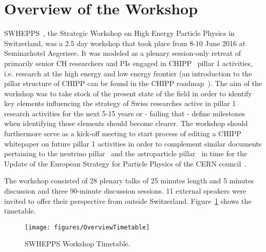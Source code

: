 \section{Overview of the Workshop}\label{Overview}

\noindent SWHEPPS~\cite{workshopindico},  the Strategic Workshop on High Energy Particle Physics in Switzerland, was a 2.5 day workshop that took place from 8-10 June 2016 at 
Seminarhotel Aegerisee.   It was  modeled as a plenary session-only retreat of primarily senior CH researchers and PIs engaged in CHIPP~\cite{chipp} pillar 1 activities, 
i.e. research at the high energy and low energy frontier (an introduction to the pillar structure of CHIPP can be found in the CHIPP roadmap~\cite{roadmap}). The aim  of the workshop
 was to take stock of the present state of the field in order to identify key elements influencing the strategy of Swiss researches active in pillar 1 research activities for the next 5-15 years or
 - failing that - define milestones when identifying those elements should become clearer. The workshop should furthermore serve as a kick-off meeting to start  process of editing a
 CHIPP whitepaper on future pillar 1 activities in order to  complement similar documents pertaining to the neutrino pillar~\cite{neutrinowhitepaper} and the astroparticle 
  pillar~\cite{astroparticlepillarwhitepaper} in time for the Update of the European Strategy for Particle Physics  of the  CERN council~\cite{europeanstrategy}. 


The workshop consisted of 28 plenary talks of 25 minutes length and 5 minutes discussion  and three 90-minute discussion sessions. 11 external speakers were invited to offer
their perspective from outside Switzerland. Figure~\ref{fig:timetable} shows the timetable.

 
\begin{figure}[htb]
  \begin{center}\texttt{[image: figures/OverviewTimetable]}
    \caption{SWHEPPS Workshop Timetable.}   \label{fig:timetable}
 \end{center}
 \end{figure}

 


 

